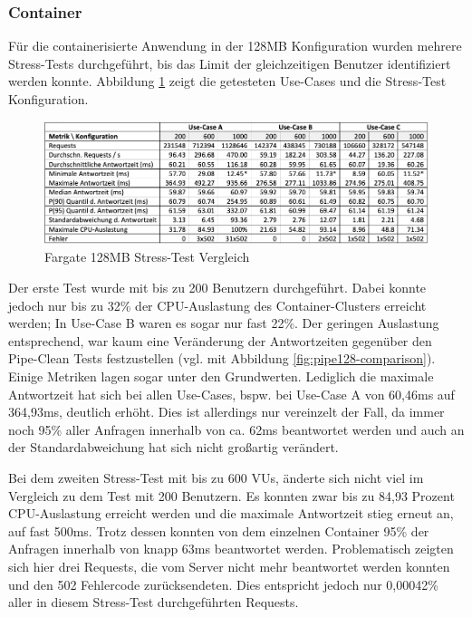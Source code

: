 \subsubsection{Container}
Für die containerisierte Anwendung in der 128MB Konfiguration wurden mehrere Stress-Tests durchgeführt, bis das Limit der gleichzeitigen Benutzer identifiziert werden konnte. Abbildung \ref{fig:fargate128-stress-comparison} zeigt die getesteten Use-Cases und die Stress-Test Konfiguration. 

\begin{figure}[H]
    \includegraphics[width=\textwidth]{img/fargate128-stress-comparison.png}
    \caption[Fargate 128MB Stress-Test Vergleich]{Fargate 128MB Stress-Test Vergleich}
    \label{fig:fargate128-stress-comparison}
\end{figure}

Der erste Test wurde mit bis zu 200 Benutzern durchgeführt. Dabei konnte jedoch nur bis zu 32\% der CPU-Auslastung des Container-Clusters erreicht werden; In Use-Case B waren es sogar nur fast 22\%. Der geringen Auslastung entsprechend, war kaum eine Veränderung der Antwortzeiten gegenüber den Pipe-Clean Tests festzustellen (vgl. mit Abbildung \ref{fig:pipe128-comparison}). Einige Metriken lagen sogar unter den Grundwerten. Lediglich die maximale Antwortzeit hat sich bei allen Use-Cases, bspw. bei Use-Case A von 60,46ms auf 364,93ms, deutlich erhöht. Dies ist allerdings nur vereinzelt der Fall, da immer noch 95\% aller Anfragen innerhalb von ca. 62ms beantwortet werden und auch an der Standardabweichung hat sich nicht großartig verändert. 

Bei dem zweiten Stress-Test mit bis zu 600 VUs, änderte sich nicht viel im Vergleich zu dem Test mit 200 Benutzern. Es konnten zwar bis zu 84,93 Prozent CPU-Auslastung erreicht werden und die maximale Antwortzeit stieg erneut an, auf fast 500ms. Trotz dessen konnten von dem einzelnen Container 95\% der Anfragen innerhalb von knapp 63ms beantwortet werden. Problematisch zeigten sich hier drei Requests, die vom Server nicht mehr beantwortet werden konnten und den 502 Fehlercode zurücksendeten. Dies entspricht jedoch nur 0,00042\% aller in diesem Stress-Test durchgeführten Requests.

